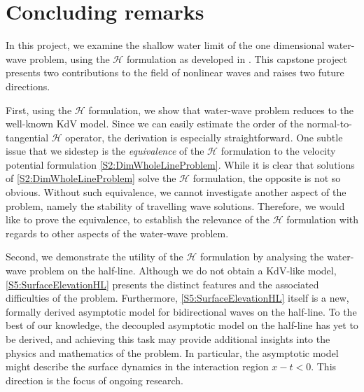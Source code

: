 \section{Concluding remarks}

In this project, we examine the shallow water limit of the one dimensional water-wave problem, using the $\mathcal{H}$ formulation as developed in \cite{OV2013}. This capstone project presents two contributions to the field of nonlinear waves and raises two future directions. 

First, using the $\mathcal{H}$ formulation, we show that water-wave problem reduces to the well-known KdV model. Since we can easily estimate the order of the normal-to-tangential $\mathcal{H}$ operator, the derivation is especially straightforward. One subtle issue that we sidestep is the \textit{equivalence} of the $\mathcal{H}$ formulation to the velocity potential formulation \eqref{S2:DimWholeLineProblem}. While it is clear that solutions of \eqref{S2:DimWholeLineProblem} solve the $\mathcal{H}$ formulation, the opposite is not so obvious. Without such equivalence, we cannot investigate another aspect of the problem, namely the stability of travelling wave solutions. Therefore, we would like to prove the equivalence, to establish the relevance of the $\mathcal{H}$ formulation with regards to other aspects of the water-wave problem.

Second, we demonstrate the utility of the $\mathcal{H}$ formulation by analysing the water-wave problem on the half-line. Although we do not obtain a KdV-like model, \eqref{S5:SurfaceElevationHL} presents the distinct features and the associated difficulties of the problem. Furthermore, \eqref{S5:SurfaceElevationHL} itself is a new, formally derived asymptotic model for bidirectional waves on the half-line. To the best of our knowledge, the decoupled asymptotic model on the half-line has yet to be derived, and achieving this task may provide additional insights into the physics and mathematics of the problem. In particular, the asymptotic model might describe the surface dynamics in the interaction region $x-t <0.$ This direction is the focus of ongoing research.